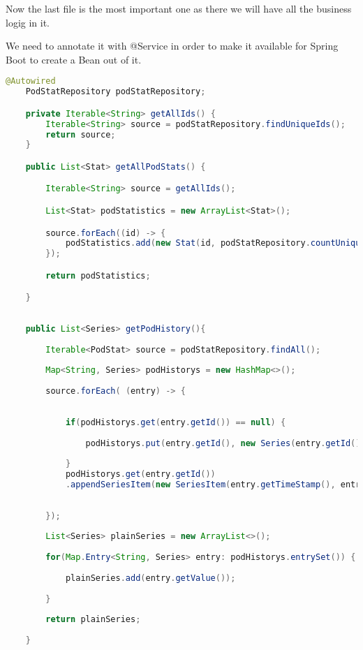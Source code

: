 Now the last file is the most important one as there we will have all the business logig in it.

We need to annotate it with @Service in order to make it available for Spring Boot to create a Bean out of it.


\begin{lstlisting}[language=Java]
@Autowired
	PodStatRepository podStatRepository;

	private Iterable<String> getAllIds() {
		Iterable<String> source = podStatRepository.findUniqueIds();
		return source;
	}

	public List<Stat> getAllPodStats() {

		Iterable<String> source = getAllIds();

		List<Stat> podStatistics = new ArrayList<Stat>();

		source.forEach((id) -> {
			podStatistics.add(new Stat(id, podStatRepository.countUniqueId(id)));
		});

		return podStatistics;

	}
	
	
	public List<Series> getPodHistory(){
		
		Iterable<PodStat> source = podStatRepository.findAll();
		
		Map<String, Series> podHistorys = new HashMap<>();
		
		source.forEach( (entry) -> {
			
			
			if(podHistorys.get(entry.getId()) == null) {
				
				podHistorys.put(entry.getId(), new Series(entry.getId()));
				
			}
			podHistorys.get(entry.getId())
			.appendSeriesItem(new SeriesItem(entry.getTimeStamp(), entry.getCounter()));
						
			
		});
		
		List<Series> plainSeries = new ArrayList<>();
		
		for(Map.Entry<String, Series> entry: podHistorys.entrySet()) {
			
			plainSeries.add(entry.getValue());
			
		}
		
		return plainSeries;
		
	}

\end{lstlisting}
